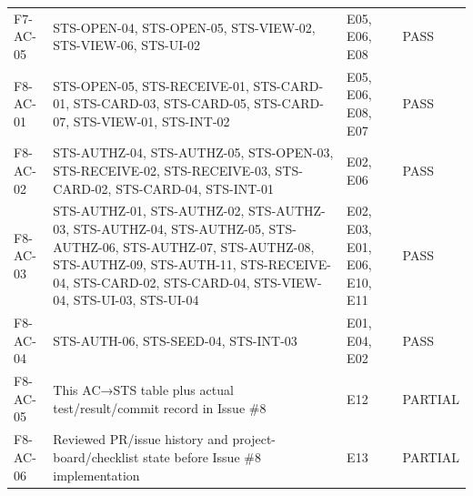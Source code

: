 \begin{longtable}{@{}>{\raggedright\arraybackslash}p{}>{\raggedright\arraybackslash}p{}>{\raggedright\arraybackslash}p{}>{\raggedright\arraybackslash}p{}@{}}
\mbox{F7-AC-05} & \mbox{STS-OPEN-04}, \mbox{STS-OPEN-05}, \mbox{STS-VIEW-02}, \mbox{STS-VIEW-06}, \mbox{STS-UI-02} & E05, E06, E08 & PASS \\
\mbox{F8-AC-01} & \mbox{STS-OPEN-05}, \mbox{STS-RECEIVE-01}, \mbox{STS-CARD-01}, \mbox{STS-CARD-03}, \mbox{STS-CARD-05}, \mbox{STS-CARD-07}, \mbox{STS-VIEW-01}, \mbox{STS-INT-02} & E05, E06, E08, E07 & PASS \\
\mbox{F8-AC-02} & \mbox{STS-AUTHZ-04}, \mbox{STS-AUTHZ-05}, \mbox{STS-OPEN-03}, \mbox{STS-RECEIVE-02}, \mbox{STS-RECEIVE-03}, \mbox{STS-CARD-02}, \mbox{STS-CARD-04}, \mbox{STS-INT-01} & E02, E06 & PASS \\
\mbox{F8-AC-03} & \mbox{STS-AUTHZ-01}, \mbox{STS-AUTHZ-02}, \mbox{STS-AUTHZ-03}, \mbox{STS-AUTHZ-04}, \mbox{STS-AUTHZ-05}, \mbox{STS-AUTHZ-06}, \mbox{STS-AUTHZ-07}, \mbox{STS-AUTHZ-08}, \mbox{STS-AUTHZ-09}, \mbox{STS-AUTH-11}, \mbox{STS-RECEIVE-04}, \mbox{STS-CARD-02}, \mbox{STS-CARD-04}, \mbox{STS-VIEW-04}, \mbox{STS-UI-03}, \mbox{STS-UI-04} & E02, E03, E01, E06, E10, E11 & PASS \\
\mbox{F8-AC-04} & \mbox{STS-AUTH-06}, \mbox{STS-SEED-04}, \mbox{STS-INT-03} & E01, E04, E02 & PASS \\
\mbox{F8-AC-05} & This AC→STS table plus actual test/\allowbreak{}result/\allowbreak{}commit record in Issue \#8 & E12 & PARTIAL \\
\mbox{F8-AC-06} & Reviewed PR/\allowbreak{}issue history and project-board/\allowbreak{}checklist state before Issue \#8 implementation & E13 & PARTIAL \\
\end{longtable}
\normalsize
\setlength{\tabcolsep}{6pt}
\renewcommand{\arraystretch}{1.15}
